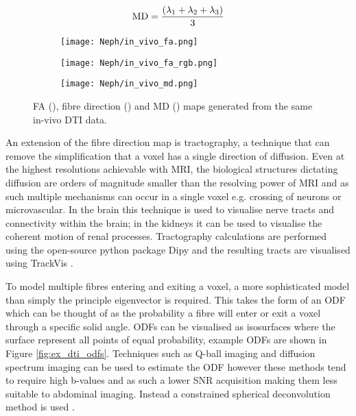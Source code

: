 \begin{equation}
	\textup{MD} = \frac{\left( \lambda_1 + \lambda_2 + \lambda_3 \right)}{3}
	\label{eq:ex_dti_md}
\end{equation}

\begin{figure}[H]
	\centering
	\begin{subfigure}[c]{0.31\textwidth}
		\centering
			\texttt{[image: Neph/in\_vivo\_fa.png]}
		\caption{}
		\label{fig:ex_dti_fa}
	\end{subfigure}
	\hfill
	\begin{subfigure}[c]{0.31\textwidth}
		\centering
			\texttt{[image: Neph/in\_vivo\_fa\_rgb.png]}
		\caption{}
		\label{fig:ex_dti_fa_rgb}
	\end{subfigure}
	\hfill	
	\begin{subfigure}[c]{0.31\textwidth}
		\centering
			\texttt{[image: Neph/in\_vivo\_md.png]}
		\caption{}
		\label{fig:ex_dti_md}
	\end{subfigure}
	\caption{\ac{FA} (), fibre direction () and \ac{MD} () maps generated from the same in-vivo \ac{DTI} data.}
	\label{fig:ex_dti_maps}
\end{figure}

An extension of the fibre direction map is tractography, a technique that can remove the simplification that a voxel has a single direction of diffusion. Even at the highest resolutions achievable with \ac{MRI}, the biological structures dictating diffusion are orders of magnitude smaller than the resolving power of \ac{MRI} and as such multiple mechanisms can occur in a single voxel e.g. crossing of neurons or microvascular. In the brain this technique is used to visualise nerve tracts and connectivity within the brain; in the kidneys it can be used to visualise the coherent motion of renal processes. Tractography calculations are performed using the open-source python package Dipy \cite{garyfallidis_dipy_2014} and the resulting tracts are visualised using TrackVis \cite{wang_diffusion_2007}.

To model multiple fibres entering and exiting a voxel, a more sophisticated model than simply the principle eigenvector is required. This takes the form of an \ac{ODF} which can be thought of as the probability a fibre will enter or exit a voxel through a specific solid angle. \acp{ODF} can be visualised as isosurfaces where the surface represent all points of equal probability, example \acp{ODF} are shown in Figure \ref{fig:ex_dti_odfs}. Techniques such as Q-ball imaging \cite{descoteaux_regularized_2007, hess_q-ball_2006} and diffusion spectrum imaging \cite{descoteaux_regularized_2007} can be used to estimate the \ac{ODF} however these methods tend to require high b-values and as such a lower \ac{SNR} acquisition making them less suitable to abdominal imaging. Instead a constrained spherical deconvolution method is used \cite{tournier_direct_2004, tournier_robust_2007, tax_recursive_2014}.

